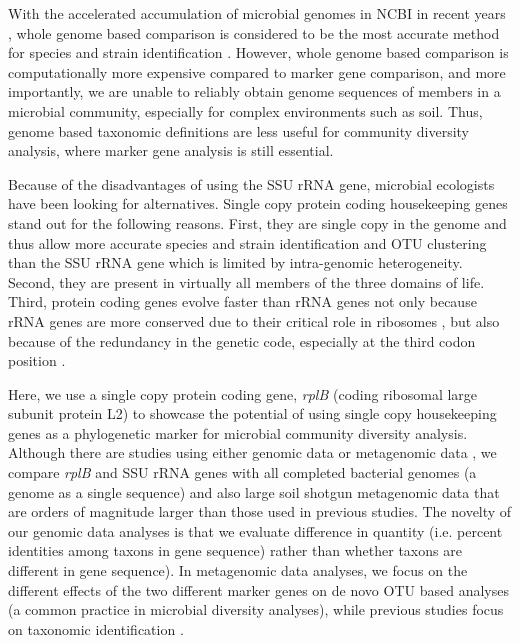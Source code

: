 \documentclass[]{msu-thesis}
\begin{document}
With the accelerated accumulation of microbial genomes in NCBI in recent years \cite{land_insights_2015}, whole genome based comparison is considered to be the most accurate method for species and strain identification \cite{goris_dna-dna_2007,luo_genome_2011,land_insights_2015,varghese_microbial_2015,scortichini_genomic_2013}. However, whole genome based comparison is computationally more expensive compared to marker gene comparison, and more importantly, we are unable to reliably obtain genome sequences of members in a microbial community, especially for complex environments such as soil. Thus, genome based taxonomic definitions are less useful for community diversity analysis, where marker gene analysis is still essential.

Because of the disadvantages of using the SSU rRNA gene, microbial ecologists have been looking for alternatives. Single copy protein coding housekeeping genes stand out for the following reasons. First, they are single copy in the genome and thus allow more accurate species and strain identification and OTU clustering than the SSU rRNA gene which is limited by intra-genomic heterogeneity. Second, they are present in virtually all members of the three domains of life. Third, protein coding genes evolve faster than rRNA genes not only because rRNA genes are more conserved due to their critical role in ribosomes \cite{carter_functional_2000}, but also because of the redundancy in the genetic code, especially at the third codon position \cite{case_use_2007}.

Here, we use a single copy protein coding gene, \textit{rplB} (coding ribosomal large subunit protein L2) to showcase the potential of using single copy housekeeping genes as a phylogenetic marker for microbial community diversity analysis. Although there are studies using either genomic data or metagenomic data \cite{case_use_2007,roux_comparison_2011}, we compare \textit{rplB} and SSU rRNA genes with all completed bacterial genomes (a genome as a single sequence) and also large soil shotgun metagenomic data that are orders of magnitude larger than those used in previous studies. The novelty of our genomic data analyses is that we evaluate difference in quantity (i.e. percent identities among taxons in gene sequence) rather than whether taxons are different in gene sequence). In metagenomic data analyses, we focus on the different effects of the two different marker genes on de novo OTU based analyses (a common practice in microbial diversity analyses), while previous studies focus on taxonomic identification \cite{case_use_2007,roux_comparison_2011}. 
\end{document}
